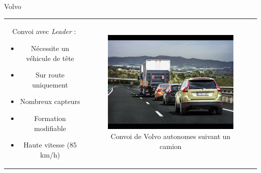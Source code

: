 \documentclass{beamer}
\begin{document}
\begin{frame}{Volvo}
  \begin{tabular}{c c}
    \begin{minipage}{0.5\linewidth}
      Convoi avec \textit{Leader} :
      \begin{itemize}
      \item Nécessite un véhicule de tête
      \item Sur route uniquement
      \item Nombreux capteurs
      \item Formation modifiable
      \item Haute vitesse (85 km/h)
      \end{itemize}
    \end{minipage}
    &
    \begin{minipage}{0.5\linewidth}
      \begin{figure}
        \includegraphics[width=1.0\linewidth]{images/ConvoiVolvo.jpg}
        \caption{Convoi de Volvo autonomes suivant un camion}
      \end{figure}
    \end{minipage}
  \end{tabular}
\end{frame}
\end{document}
